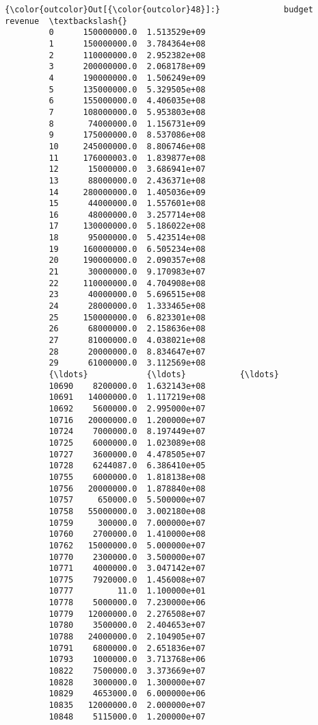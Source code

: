 \documentclass[11pt]{article}
\begin{document}
\begin{Verbatim}[commandchars=\\\{\}]
{\color{outcolor}Out[{\color{outcolor}48}]:}             budget       revenue  \textbackslash{}
         0      150000000.0  1.513529e+09   
         1      150000000.0  3.784364e+08   
         2      110000000.0  2.952382e+08   
         3      200000000.0  2.068178e+09   
         4      190000000.0  1.506249e+09   
         5      135000000.0  5.329505e+08   
         6      155000000.0  4.406035e+08   
         7      108000000.0  5.953803e+08   
         8       74000000.0  1.156731e+09   
         9      175000000.0  8.537086e+08   
         10     245000000.0  8.806746e+08   
         11     176000003.0  1.839877e+08   
         12      15000000.0  3.686941e+07   
         13      88000000.0  2.436371e+08   
         14     280000000.0  1.405036e+09   
         15      44000000.0  1.557601e+08   
         16      48000000.0  3.257714e+08   
         17     130000000.0  5.186022e+08   
         18      95000000.0  5.423514e+08   
         19     160000000.0  6.505234e+08   
         20     190000000.0  2.090357e+08   
         21      30000000.0  9.170983e+07   
         22     110000000.0  4.704908e+08   
         23      40000000.0  5.696515e+08   
         24      28000000.0  1.333465e+08   
         25     150000000.0  6.823301e+08   
         26      68000000.0  2.158636e+08   
         27      81000000.0  4.038021e+08   
         28      20000000.0  8.834647e+07   
         29      61000000.0  3.112569e+08   
         {\ldots}            {\ldots}           {\ldots}   
         10690    8200000.0  1.632143e+08   
         10691   14000000.0  1.117219e+08   
         10692    5600000.0  2.995000e+07   
         10716   20000000.0  1.200000e+07   
         10724    7000000.0  8.197449e+07   
         10725    6000000.0  1.023089e+08   
         10727    3600000.0  4.478505e+07   
         10728    6244087.0  6.386410e+05   
         10755    6000000.0  1.818138e+08   
         10756   20000000.0  1.878840e+08   
         10757     650000.0  5.500000e+07   
         10758   55000000.0  3.002180e+08   
         10759     300000.0  7.000000e+07   
         10760    2700000.0  1.410000e+08   
         10762   15000000.0  5.000000e+07   
         10770    2300000.0  3.500000e+07   
         10771    4000000.0  3.047142e+07   
         10775    7920000.0  1.456008e+07   
         10777         11.0  1.100000e+01   
         10778    5000000.0  7.230000e+06   
         10779   12000000.0  2.276508e+07   
         10780    3500000.0  2.404653e+07   
         10788   24000000.0  2.104905e+07   
         10791    6800000.0  2.651836e+07   
         10793    1000000.0  3.713768e+06   
         10822    7500000.0  3.373669e+07   
         10828    3000000.0  1.300000e+07   
         10829    4653000.0  6.000000e+06   
         10835   12000000.0  2.000000e+07   
         10848    5115000.0  1.200000e+07   
         

\end{Verbatim}
\end{document}
